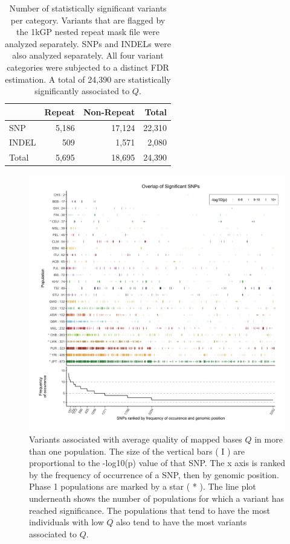 \documentclass[9pt,lineno]{elife}
\begin{document}
\begin{table}
\centering
\begin{tabular}{l  r r r}
                      & {Repeat}  & {Non-Repeat}   & {Total}    \\ \hline
{SNP}  & 5,186 & 17,124 & 22,310\\  
{INDEL} & 509 & 1,571 & 2,080\\ \hline
{Total} & 5,695 & 18,695 & 24,390\\
\end{tabular}
\caption{Number of statistically significant variants per category. 
Variants that are flagged by the 1kGP nested repeat mask file were analyzed separately. SNPs and INDELs were also analyzed separately. All four variant categories were subjected to a distinct FDR estimation.
A total of 24,390 are statistically significantly associated to $Q$.}
\label{sigTable}
\end{table}

\begin{figure}
\includegraphics[width=\hsize,keepaspectratio]{./Figures/SNPOverlap6.jpg}

\caption{Variants associated with average quality of mapped bases $Q$ in more than one population.
The size of the vertical bars ( I ) are proportional to the -log10(p) value of that SNP.
The x axis is ranked by the frequency of occurrence of a SNP, then by genomic position.
Phase 1 populations are marked by a star ( * ).
The line plot underneath shows the number of populations for which a variant has reached significance.
The populations that tend to have the most individuals with low $Q$ also tend to have the most variants associated to $Q$.}
  \label{OverLap}
\end{figure}
\end{document}
